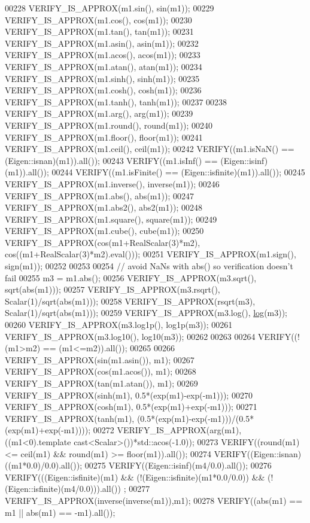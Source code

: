 \begin{DoxyCode}
00228   VERIFY\_IS\_APPROX(m1.sin(), sin(m1));
00229   VERIFY\_IS\_APPROX(m1.cos(), cos(m1));
00230   VERIFY\_IS\_APPROX(m1.tan(), tan(m1));
00231   VERIFY\_IS\_APPROX(m1.asin(), asin(m1));
00232   VERIFY\_IS\_APPROX(m1.acos(), acos(m1));
00233   VERIFY\_IS\_APPROX(m1.atan(), atan(m1));
00234   VERIFY\_IS\_APPROX(m1.sinh(), sinh(m1));
00235   VERIFY\_IS\_APPROX(m1.cosh(), cosh(m1));
00236   VERIFY\_IS\_APPROX(m1.tanh(), tanh(m1));
00237 
00238   VERIFY\_IS\_APPROX(m1.arg(), arg(m1));
00239   VERIFY\_IS\_APPROX(m1.round(), round(m1));
00240   VERIFY\_IS\_APPROX(m1.floor(), floor(m1));
00241   VERIFY\_IS\_APPROX(m1.ceil(), ceil(m1));
00242   VERIFY((m1.isNaN() == (Eigen::isnan)(m1)).all());
00243   VERIFY((m1.isInf() == (Eigen::isinf)(m1)).all());
00244   VERIFY((m1.isFinite() == (Eigen::isfinite)(m1)).all());
00245   VERIFY\_IS\_APPROX(m1.inverse(), inverse(m1));
00246   VERIFY\_IS\_APPROX(m1.abs(), abs(m1));
00247   VERIFY\_IS\_APPROX(m1.abs2(), abs2(m1));
00248   VERIFY\_IS\_APPROX(m1.square(), square(m1));
00249   VERIFY\_IS\_APPROX(m1.cube(), cube(m1));
00250   VERIFY\_IS\_APPROX(cos(m1+RealScalar(3)*m2), cos((m1+RealScalar(3)*m2).eval()));
00251   VERIFY\_IS\_APPROX(m1.sign(), sign(m1));
00252 
00253 
00254   \textcolor{comment}{// avoid NaNs with abs() so verification doesn't fail}
00255   m3 = m1.abs();
00256   VERIFY\_IS\_APPROX(m3.sqrt(), sqrt(abs(m1)));
00257   VERIFY\_IS\_APPROX(m3.rsqrt(), Scalar(1)/sqrt(abs(m1)));
00258   VERIFY\_IS\_APPROX(rsqrt(m3), Scalar(1)/sqrt(abs(m1)));
00259   VERIFY\_IS\_APPROX(m3.log(), \hyperlink{structlog}{log}(m3));
00260   VERIFY\_IS\_APPROX(m3.log1p(), log1p(m3));
00261   VERIFY\_IS\_APPROX(m3.log10(), log10(m3));
00262 
00263 
00264   VERIFY((!(m1>m2) == (m1<=m2)).all());
00265 
00266   VERIFY\_IS\_APPROX(sin(m1.asin()), m1);
00267   VERIFY\_IS\_APPROX(cos(m1.acos()), m1);
00268   VERIFY\_IS\_APPROX(tan(m1.atan()), m1);
00269   VERIFY\_IS\_APPROX(sinh(m1), 0.5*(exp(m1)-exp(-m1)));
00270   VERIFY\_IS\_APPROX(cosh(m1), 0.5*(exp(m1)+exp(-m1)));
00271   VERIFY\_IS\_APPROX(tanh(m1), (0.5*(exp(m1)-exp(-m1)))/(0.5*(exp(m1)+exp(-m1))));
00272   VERIFY\_IS\_APPROX(arg(m1), ((m1<0).\textcolor{keyword}{template} cast<Scalar>())*std::acos(-1.0));
00273   VERIFY((round(m1) <= ceil(m1) && round(m1) >= floor(m1)).all());
00274   VERIFY((Eigen::isnan)((m1*0.0)/0.0).all());
00275   VERIFY((Eigen::isinf)(m4/0.0).all());
00276   VERIFY(((Eigen::isfinite)(m1) && (!(Eigen::isfinite)(m1*0.0/0.0)) && (!(Eigen::isfinite)(m4/0.0))).all())
      ;
00277   VERIFY\_IS\_APPROX(inverse(inverse(m1)),m1);
00278   VERIFY((abs(m1) == m1 || abs(m1) == -m1).all());

\end{DoxyCode}
